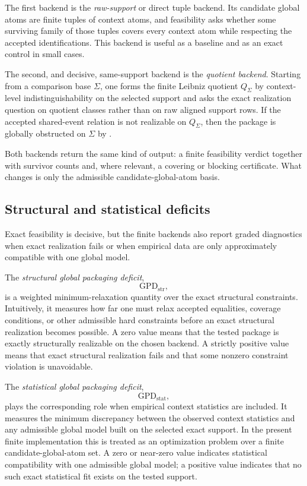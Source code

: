 \documentclass[11pt]{article}
\newcommand{\GPDstr}{\mathrm{GPD}_{\mathrm{str}}}
\newcommand{\GPDstat}{\mathrm{GPD}_{\mathrm{stat}}}
\theoremstyle{definition}
\begin{document}
The first backend is the \emph{raw-support} or direct tuple backend. Its candidate global atoms are finite tuples of context atoms, and feasibility asks whether some surviving family of those tuples covers every context atom while respecting the accepted identifications. This backend is useful as a baseline and as an exact control in small cases.

The second, and decisive, same-support backend is the \emph{quotient backend}. Starting from a comparison base \(\Sigma\), one forms the finite Leibniz quotient \(Q_\Sigma\) by context-level indistinguishability on the selected support and asks the exact realization question on quotient classes rather than on raw aligned support rows. If the accepted shared-event relation is not realizable on \(Q_\Sigma\), then the package is globally obstructed on \(\Sigma\) by .

Both backends return the same kind of output: a finite feasibility verdict together with survivor counts and, where relevant, a covering or blocking certificate. What changes is only the admissible candidate-global-atom basis.

\subsection{Structural and statistical deficits}

Exact feasibility is decisive, but the finite backends also report graded diagnostics when exact realization fails or when empirical data are only approximately compatible with one global model.

The \emph{structural global packaging deficit},
\[
\GPDstr,
\]
is a weighted minimum-relaxation quantity over the exact structural constraints. Intuitively, it measures how far one must relax accepted equalities, coverage conditions, or other admissible hard constraints before an exact structural realization becomes possible. A zero value means that the tested package is exactly structurally realizable on the chosen backend. A strictly positive value means that exact structural realization fails and that some nonzero constraint violation is unavoidable.

The \emph{statistical global packaging deficit},
\[
\GPDstat,
\]
plays the corresponding role when empirical context statistics are included. It measures the minimum discrepancy between the observed context statistics and any admissible global model built on the selected exact support. In the present finite implementation this is treated as an optimization problem over a finite candidate-global-atom set. A zero or near-zero value indicates statistical compatibility with one admissible global model; a positive value indicates that no such exact statistical fit exists on the tested support.
\end{document}
